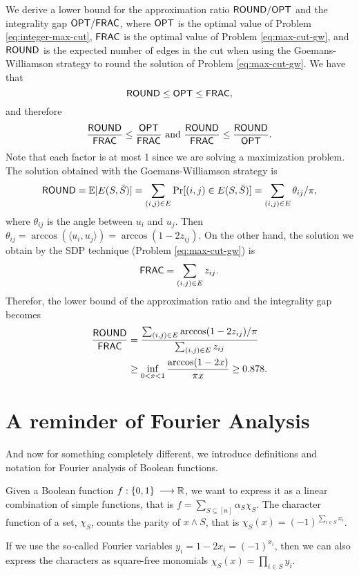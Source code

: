 \documentclass[a4paper,twoside,justified]{tufte-handout}
\begin{document}
We derive a lower bound for the approximation ratio $\mathsf{ROUND} / \mathsf{OPT}$ and the integrality gap $\mathsf{OPT} / \mathsf{FRAC}$, where $\mathsf{OPT}$ is the optimal value of Problem \eqref{eq:integer-max-cut}, $\mathsf{FRAC}$ is the optimal value of Problem \eqref{eq:max-cut-gw}, and $\mathsf{ROUND}$ is the expected number of edges in the cut when using the Goemans-Williamson strategy to round the solution of Problem \eqref{eq:max-cut-gw}. We have that
\begin{equation*}
\mathsf{ROUND}\leq\mathsf{OPT}\leq\mathsf{FRAC},
\end{equation*}
and therefore
\begin{equation*}
\frac{\mathsf{ROUND}}{\mathsf{FRAC}}\leq \frac{\mathsf{OPT}}{\mathsf{FRAC}}\ \text{and}\ \frac{\mathsf{ROUND}}{\mathsf{FRAC}}\leq \frac{\mathsf{ROUND}}{\mathsf{OPT}}.
\end{equation*}
Note that each factor is at most 1 since we are solving a maximization problem. The solution obtained with the Goemans-Williamson strategy is 
\[\mathsf{ROUND} = \mathbb{E}|E(S,\bar S)|=\sum_{(i,j)\in E}\Pr[(i,j)\in E(S,\bar S)]=\sum_{(i,j)\in E} \theta_{ij}/\pi,\]
 where $\theta_{ij}$ is the angle between $u_i$ and $u_j$. Then $\theta_{ij}=\arccos(\langle u_i,u_j \rangle) = \arccos(1-2z_{ij})$. On the other hand, the solution we obtain by the SDP technique (Problem \eqref{eq:max-cut-gw}) is 
\[\mathsf{FRAC} = \sum_{(i,j)\in E} z_{ij}.\] 
Therefor, the lower bound of the approximation ratio and the integrality gap becomes
 \begin{alignat*}{2}
\frac{\mathsf{ROUND}}{\mathsf{FRAC}} &= \frac{\sum_{(i,j)\in E} \arccos(1-2z_{ij})/\pi}{\sum_{(i,j)\in E} z_{ij}} \\
&\geq \inf_{0 < x < 1} \frac{\arccos(1-2x)}{\pi x} \geq 0.878.
\end{alignat*}


\section{A reminder of Fourier Analysis}

And now for something completely different, we introduce definitions and notation for Fourier analysis of Boolean functions.

Given a Boolean function $f:\{0,1\}\:\longrightarrow \mathbb{R}$, we want to express it as a linear combination of simple functions, that is $f = \sum_{S \subseteq [n]} \alpha_S \chi_S$. The character function of a set, $\chi_S$, counts the parity of $x \land S$, that is $\chi_S(x) = (-1)^{\sum_{i\in S} x_i}$.

If we use the so-called Fourier variables $y_i = 1-2x_i = (-1)^{x_i}$, then we can also express the characters as square-free monomials $\chi_S(x) = \prod_{i\in S} y_i$.
\end{document}
